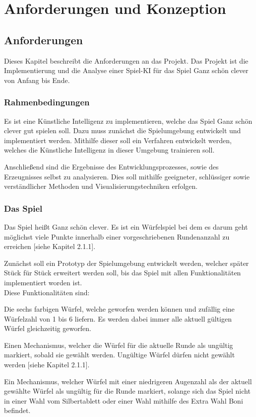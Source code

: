 \section{Anforderungen und Konzeption}
\subsection{Anforderungen}
Dieses Kapitel beschreibt die Anforderungen an das Projekt. Das Projekt ist die Implementierung und die Analyse einer Spiel-KI für das Spiel Ganz schön clever von Anfang bis Ende.
\subsubsection{Rahmenbedingungen}
Es ist eine Künstliche Intelligenz zu implementieren, welche das Spiel Ganz schön clever gut spielen soll. Dazu muss zunächst die Spielumgebung entwickelt und implementiert werden. Mithilfe dieser soll ein Verfahren entwickelt werden, welches die Künstliche Intelligenz in dieser Umgebung trainieren soll.

Anschließend sind die Ergebnisse des Entwicklungsprozesses, sowie des Erzeugnisses selbst zu analysieren. Dies soll mithilfe geeigneter, schlüssiger sowie verständlicher Methoden und Visualisierungstechniken erfolgen.
\subsubsection{Das Spiel}
Das Spiel heißt Ganz schön clever. Es ist ein Würfelspiel bei dem es darum geht möglichst viele Punkte innerhalb einer vorgeschriebenen Rundenanzahl zu erreichen [siehe Kapitel 2.1.1].

Zunächst soll ein Prototyp der Spielumgebung entwickelt werden, welcher später Stück für Stück erweitert werden soll, bis das Spiel mit allen Funktionalitäten implementiert worden ist.\\

Diese Funktionalitäten sind:

Die sechs farbigen Würfel, welche geworfen werden können und zufällig eine Würfelzahl von 1 bis 6 liefern. Es werden dabei immer alle aktuell gültigen Würfel gleichzeitig geworfen.

Einen Mechanismus, welcher die Würfel für die aktuelle Runde als ungültig markiert, sobald sie gewählt werden. Ungültige Würfel dürfen nicht gewählt werden [siehe Kapitel 2.1.1].

Ein Mechanismus, welcher Würfel mit einer niedrigeren Augenzahl als der aktuell gewählte Würfel als ungültig für die Runde markiert, solange sich das Spiel nicht in einer Wahl vom Silbertablett oder einer Wahl mithilfe des Extra Wahl Boni befindet.

